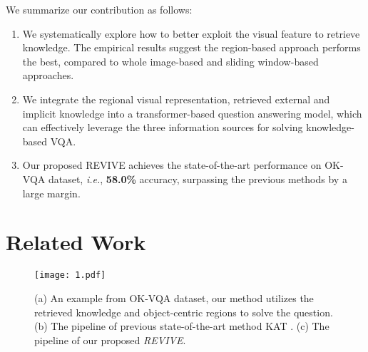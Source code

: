 \documentclass{article}
\begin{document}
We summarize our contribution as follows:

\begin{enumerate}[label=(\alph*)]
\item We systematically explore how to better exploit the visual feature to retrieve knowledge. The empirical results suggest the region-based approach performs the best, compared to whole image-based and sliding window-based approaches.
\item We integrate the regional visual representation, retrieved external and implicit knowledge into a transformer-based question answering model, which can effectively leverage the three information sources for solving knowledge-based VQA.  

\item Our proposed REVIVE achieves the state-of-the-art performance on OK-VQA dataset, \textit{i.e.}, \textbf{58.0\%} accuracy, surpassing the previous methods by a large margin.


\end{enumerate}

\section{Related Work}

\begin{figure*}
\begin{center}

\texttt{[image: 1.pdf]}
\end{center}
\vspace{-3mm}
   \caption{(a) An example from OK-VQA dataset, our method utilizes the retrieved knowledge and object-centric regions to solve the question.  (b) The pipeline of previous state-of-the-art method KAT \cite{gui2021kat}. (c) The pipeline of our proposed \textit{REVIVE}. }
\label{fig:comparison}
\vspace{-2mm}
\end{figure*}
\end{document}
